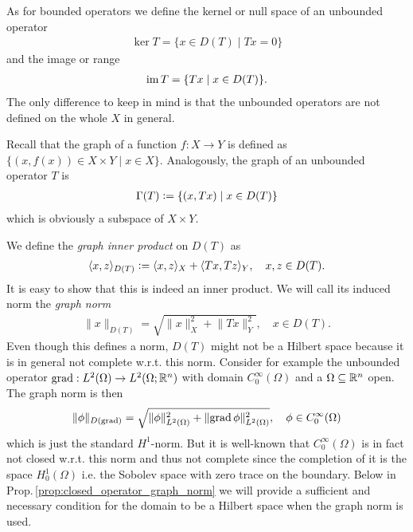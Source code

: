 \documentclass[../main.tex]{subfiles}
\begin{document}
As for bounded operators we define the kernel or null space of an unbounded
operator 
\begin{align*}
    \ker T = \{ x \in D(T) \mid Tx = 0\}
\end{align*}
and the image or range
\begin{align*}
    \operatorname{im} T = \{ Tx \mid x \in D(T)\}.
\end{align*}
The only difference to keep in mind is that the unbounded operators are not 
defined on the whole $X$ in general.

Recall that the graph of a function $f: X \rightarrow Y$ is defined 
as $\{ (x,f(x)) \in X \times Y \mid x \in X\}$. 
Analogously, the graph of an unbounded operator $T$ is 
\begin{align*}
    \Gamma(T) \vcentcolon= \{ (x,Tx) \mid x \in D(T) \}
\end{align*}
which is obviously a subspace of $X\times Y$.

We define the \textit{graph inner product} on $D(T)$ as 
\begin{align*}
    \langle x,z \rangle _{D(T)} 
    \vcentcolon= \langle x,z \rangle _X + \langle Tx, Tz \rangle _Y,
    \quad x,z \in D(T).
\end{align*}
It is easy to show that this is indeed an inner product. We will call its 
induced norm the \textit{graph norm}
\begin{align*}
    \lVert x \rVert _{D(T)} = \sqrt{ \lVert x \rVert^2 _X + \lVert Tx \rVert ^2 _Y}
    , \quad x\in D(T).
\end{align*}
Even though this defines a norm, $D(T)$ might not be a Hilbert space 
because it is in general not complete w.r.t. this norm. Consider for example 
the unbounded operator $\operatorname{grad}: L^2(\Omega) \rightarrow L^2(\Omega;\mathbb{R}^n)$ with 
domain $C_0^\infty(\Omega)$ and a $\Omega \subseteq \mathbb{R}^n$ open.
The graph norm is then 
\begin{align*}
    \lVert \phi \rVert _{D(\operatorname{grad})} 
    = \sqrt{ \lVert \phi \rVert^2 _{L^2(\Omega)} + \lVert \operatorname{grad} \phi \rVert^2 
        _{L^2(\Omega)}}
        , \quad \phi \in C_0^\infty(\Omega)
\end{align*}
which is just the standard $H^1$-norm.
But it is well-known that $C_0^\infty(\Omega)$ is in fact not closed 
w.r.t. this norm and thus not complete 
since the completion of it is the space $H^1_0(\Omega)$ i.e. 
the Sobolev space with zero trace on the boundary. 
Below in Prop.\,\ref{prop:closed_operator_graph_norm} we will provide a
sufficient and necessary condition for the domain to be a Hilbert space 
when the graph norm is used. 
\end{document}
